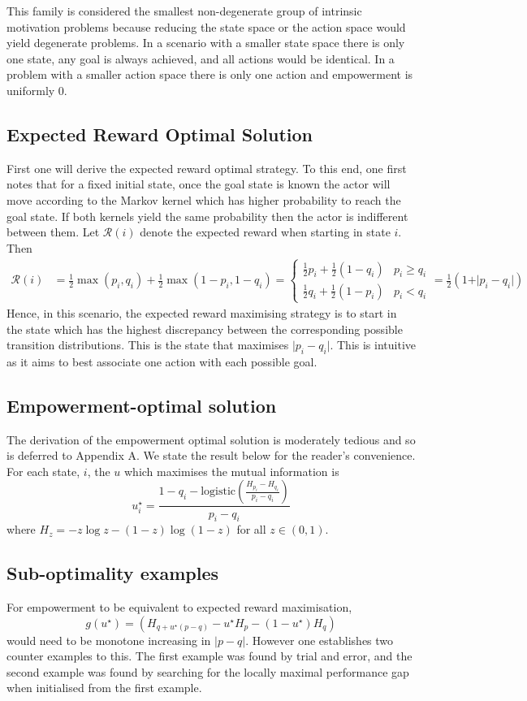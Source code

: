 \documentclass{article}
\newcommand{\Rr}{\mathcal{R}}
\begin{document}
This family is considered the smallest non-degenerate group of intrinsic motivation problems because reducing the state space or the action space would yield degenerate problems. In a scenario with a smaller state space there is only one state, any goal is always achieved, and all actions would be identical. In a problem with a smaller action space there is only one action and empowerment is uniformly $0$.

\subsection{Expected Reward Optimal Solution}
First one will derive the expected reward optimal strategy. To this end, one first notes that for a fixed initial state, once the goal state is known the actor will move according to the Markov kernel which has higher probability to reach the goal state. If both kernels yield the same probability then the actor is indifferent between them. Let $\Rr(i)$ denote the expected reward when starting in state $i$. Then
\begin{align*}
\Rr(i) 
	&= \frac{1}{2} \max(p_i,q_i) +\frac{1}{2} \max(1-p_i,1-q_i)
	=\begin{cases}
		\frac{1}{2} p_i +\frac{1}{2} (1-q_i) & p_i\geq q_i\\
		\frac{1}{2} q_i +\frac{1}{2} (1-p_i) & p_i < q_i
		\end{cases}
	=\frac{1}{2}(1+\vert p_i - q_i \vert) 	
\end{align*}
Hence, in this scenario, the expected reward maximising strategy is to start in the state which has the highest discrepancy between the corresponding possible transition distributions. This is the state that maximises $\vert p_i-q_i\vert$. This is intuitive as it aims to best associate one action with  each possible goal. 

\subsection{Empowerment-optimal solution}
The derivation of the empowerment optimal solution is moderately tedious and so is deferred to Appendix A. We state the result below for the reader's convenience. For each state, $i$, the $u$ which maximises the mutual information is 
\[u^\star_i=\frac{1-q_i-\text{logistic}\left(\frac{H_{p_i}-H_{q_i}}{p_i-q_i}\right)}{p_i-q_i} \]
where $H_z=-z\log z - (1-z)\log(1-z)$ for all $z\in (0,1)$. 

\subsection{Sub-optimality examples}
For empowerment to be equivalent to expected reward maximisation, 
\[g(u^\star)=\left(H_{q+u^\star(p-q)}-u^\star H_{p}-(1-u^\star)H_{q}\right)\] 
would need to be monotone increasing in $|p-q|$. However one establishes two counter examples to this. The first example was found by trial and error, and the second example was found by searching for the locally maximal performance gap when initialised from the first example. 
\end{document}
